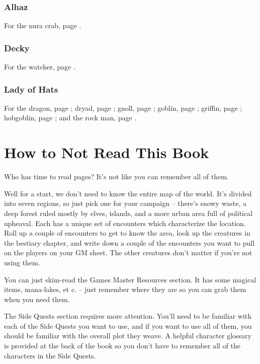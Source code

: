 \begin{multicols}{2}
\subsubsection{Alhaz}

For the nura crab, page \pageref{Alhaz/crab}.

\subsubsection{Decky}

For the watcher, page \pageref{Decky/watcher}.

\subsubsection{Lady of Hats}

For the 
dragon, page \pageref{loh/dragon};
dryad, page \pageref{loh/dryad};
gnoll, page \pageref{loh/gnoll};
goblin, page \pageref{loh/goblin};
griffin, page \pageref{loh/griffin};
hobgoblin, page \pageref{loh/hobgoblin};
and
the rock man, page \pageref{loh/rockman}.

\end{multicols}

\section*{How to Not Read This Book}

\begin{multicols}{2}

\noindent Who has time to read \pageref{lastpage} pages?  It's not like you can remember all of them.

Well for a start, we don't need to know the entire map of the world.
It's divided into seven regions, so just pick one for your campaign -- there's snowy waste, a deep forest ruled mostly by elves, islands, and a more urban area full of political upheaval.
Each has a unique set of encounters which characterize the location.
Roll up a couple of encounters to get to know the area, look up the creatures in the bestiary chapter, and write down a couple of the encounters you want to pull on the players on your GM sheet.
The other creatures don't matter if you're not using them.

You can just skim-read the Games Master Resources section.
It has some magical items, mana-lakes, et c. -- just remember where they are so you can grab them when you need them.

The Side Quests section requires more attention.
You'll need to be familiar with each of the Side Quests you want to use, and if you want to use all of them, you should be familiar with the overall plot they weave.
A helpful character glossary is provided at the back of the book so you don't have to remember all of the characters in the Side Quests.

\end{multicols}

